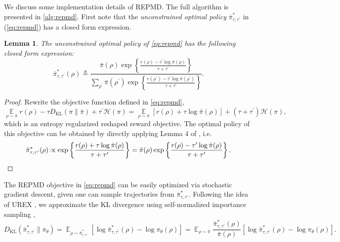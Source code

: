 \documentclass{article}
\DeclareMathOperator*\ep{\mathbb{E}}
\newcommand*{\refPi}{\bar{\pi}}
\newcommand*{\cH}{\mathcal{H}}
\newcommand{\KL}{D_{\text{KL}}}
\newtheorem{lem}{Lemma}
\begin{document}
We discuss some implementation details of REPMD. The full algorithm is presented in \cref{alg:repmd}.
First note that the \emph{unconstrained optimal policy} $\bar{\pi}_{\tau,\tau^{\prime}}^*$ in (\ref{eq:repmd}) has a closed form expression.
\begin{lem}
	\label{lem:opt_pi_ref}
	The unconstrained optimal policy of \cref{eq:repmd} has the following closed form expression:
	\[
	\bar{\pi}_{\tau,\tau^{\prime}}^*(\rho) \triangleq \frac{\refPi(\rho) \exp\left\{ \frac{r(\rho)-\tau^{\prime} \log \refPi(\rho) }{ \tau+\tau^{\prime}} \right\}}{ \sum_{\rho^{\prime}}{\refPi(\rho^{\prime}) \exp\left\{ \frac{r(\rho^{\prime})-\tau^{\prime} \log \refPi(\rho^{\prime})}{ \tau+\tau^{\prime}} \right\} } }.
	\] 
\end{lem}
\begin{proof}
	Rewrite the objective function defined in \cref{eq:repmd},
	\begin{equation}
	\ep\limits_{\rho \sim \pi} r(\rho)  - \tau \KL(\pi \| \refPi) + \tau^{\prime} \cH(\pi) = \ep\limits_{\rho \sim \pi} [r(\rho) + \tau \log \refPi(\rho)] + (\tau+\tau^{\prime}) \cH(\pi),
	\end{equation}
	which is an entropy regularized reshaped reward objective. The optimal policy of this objective can be obtained by directly applying Lemma 4 of \cite{nachum2017bridging}, i.e.
	\begin{equation}
	\bar{\pi}_{\tau,\tau^{\prime}}^*(\rho)\propto \exp\left\{ \frac{r(\rho)+\tau \log \refPi(\rho)}{\tau+\tau^{\prime}} \right\} = \refPi(\rho) \exp\left\{ \frac{r(\rho)-\tau^{\prime} \log \refPi(\rho)}{\tau+\tau^{\prime}} \right\}. \qedhere
	\end{equation}
\end{proof}
The REPMD objective in \cref{eq:repmd} can be easily optimized via stochastic gradient descent, given one can sample trajectories from $\bar{\pi}_{\tau,\tau^{\prime}}^*$.
Following the idea of UREX \cite{nachum2017improving}, we approximate the KL divergence using self-normalized importance sampling \citep{owen2013monte},
\begin{equation}
\label{eq:importance_sampling_kl}
\KL(\bar{\pi}_{\tau,\tau^{\prime}}^* \| \pi_\theta) = \ep_{\rho \sim \bar{\pi}_{\tau,\tau^{\prime}}^* } \left[ \log \bar{\pi}_{\tau,\tau^{\prime}}^*(\rho) - \log \pi_\theta(\rho) \right] = \ep_{\rho\sim \refPi} \frac{\bar{\pi}_{\tau,\tau^{\prime}}^*(\rho)}{\refPi(\rho)} \left[ \log \bar{\pi}_{\tau,\tau^{\prime}}^*(\rho) - \log \pi_\theta(\rho) \right].
\end{equation}
\end{document}
